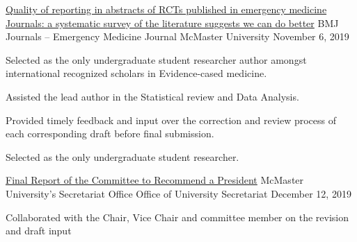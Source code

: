 

\begin{cventries}

  \cventry
    {\href{https://emj.bmj.com/content/early/2019/11/06/emermed-2019-208629}{Quality of reporting in abstracts of RCTs published in emergency medicine Journals: a systematic survey of the literature suggests we can do better}} %
    {BMJ Journals – Emergency Medicine Journal} %
    {McMaster University} %
    {November 6, 2019} %
    {
      \begin{cvitems} %
        \item {Selected as the only undergraduate student researcher author amongst international recognized scholars in Evidence-cased medicine.}
        \item {Assisted the lead author in the Statistical review and Data Analysis.}
        \item {Provided timely feedback and input over the correction and review process of each corresponding draft before final submission.}
        \item {Selected as the only undergraduate student researcher.}
      \end{cvitems}
    }
  \cventry
    {\href{https://secretariat.mcmaster.ca/app/uploads/CRP-1.pdf}{Final Report of the Committee to Recommend a President}} %
    {McMaster University’s Secretariat Office} %
    {Office of University Secretariat} %
    {December 12, 2019} %
    {
      \begin{cvitems} %
        \item {Collaborated with the Chair, Vice Chair and committee member on the revision and draft input}
      \end{cvitems}
    }

\end{cventries}
